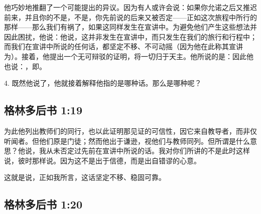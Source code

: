他巧妙地推翻了一个可能提出的异议。因为有人或许会说：如果你允诺之后又推迟前来，并且你的不是，不是，你先前说的后来又被否定——正如这次旅程中所行的那样——那么我们有祸了，如果这同样发生在宣讲中。为避免他们产生这些想法并因此困扰，他说：他说，这并非发生在宣讲中，而只发生在我们的旅行和行程中；而我们在宣讲中所说的任何话，都坚定不移、不可动摇（因为他在此称其宣讲为）。接着，他提出一个无可辩驳的证明，将一切归于天主。他所说的是：因此他也说：，即。\par

4. 既然他说了，他就接着解释他指的是哪种话。那么是哪种呢？\par


\subsection{格林多后书 1:19}

\par

为此他列出教师们的同行，也以此证明那见证的可信性，因它来自教导者，而非仅听闻者。但他们原是门徒；然而他出于谦逊，视他们与教师同列。但所谓是什么意思？他说，我从未否定过先前在宣讲中所说的话。我对你们所讲的不是此时这样说，彼时那样说。因为这不是出于信德，而是出自错谬的心意。\par

这就是说，正如我所言，这话坚定不移、稳固可靠。\par


\subsection{格林多后书 1:20}

\par

